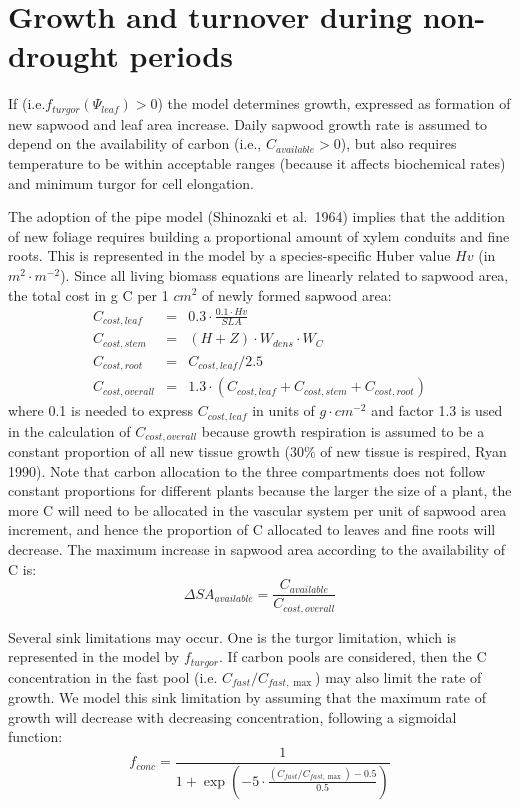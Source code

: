 \documentclass[]{book}
\begin{document}
\hypertarget{growth-and-turnover-during-non-drought-periods}{%
\section{Growth and turnover during non-drought periods}\label{growth-and-turnover-during-non-drought-periods}}

If (i.e.\(f_{turgor}(\Psi_{leaf})>0\)) the model determines growth, expressed as formation of new sapwood and leaf area increase. Daily sapwood growth rate is assumed to depend on the availability of carbon (i.e., \(C_{available}>0\)), but also requires temperature to be within acceptable ranges (because it affects biochemical rates) and minimum turgor for cell elongation.

The adoption of the pipe model (Shinozaki et al.~1964) implies that the addition of new foliage requires building a proportional amount of xylem conduits and fine roots. This is represented in the model by a species-specific Huber value \(Hv\) (in \(m^2·m^{-2}\)). Since all living biomass equations are linearly related to sapwood area, the total cost in g C per 1 \(cm^2\) of newly formed sapwood area:
\begin{eqnarray}
C_{cost,leaf} &=& 0.3 \cdot \frac{0.1\cdot Hv}{SLA}\\
C_{cost,stem} &=& (H + Z) \cdot W_{dens} \cdot W_{C}\\
C_{cost,root} &=& C_{cost,leaf}/2.5\\
C_{cost,overall} &=& 1.3 \cdot (C_{cost,leaf}+C_{cost,stem} + C_{cost,root})
\end{eqnarray}
where 0.1 is needed to express \(C_{cost,leaf}\) in units of \(g · cm^{-2}\) and factor 1.3 is used in the calculation of \(C_{cost,overall}\) because growth respiration is assumed to be a constant proportion of all new tissue growth (30\% of new tissue is respired, Ryan 1990). Note that carbon allocation to the three compartments does not follow constant proportions for different plants because the larger the size of a plant, the more C will need to be allocated in the vascular system per unit of sapwood area increment, and hence the proportion of C allocated to leaves and fine roots will decrease. The maximum increase in sapwood area according to the availability of C is:
\begin{equation}
\Delta SA_{available} = \frac{C_{available}}{C_{cost,overall}}
\end{equation}

Several sink limitations may occur. One is the turgor limitation, which is represented in the model by \(f_{turgor}\). If carbon pools are considered, then the C concentration in the fast pool (i.e. \(C_{fast}/C_{fast, \max}\)) may also limit the rate of growth. We model this sink limitation by assuming that the maximum rate of growth will decrease with decreasing concentration, following a sigmoidal function:
\begin{equation}
f_{conc} = \frac{1}{1+\exp \left(-5 \cdot \frac{(C_{fast}/C_{fast, \max})-0.5}{0.5}\right)}
\end{equation}
\end{document}
